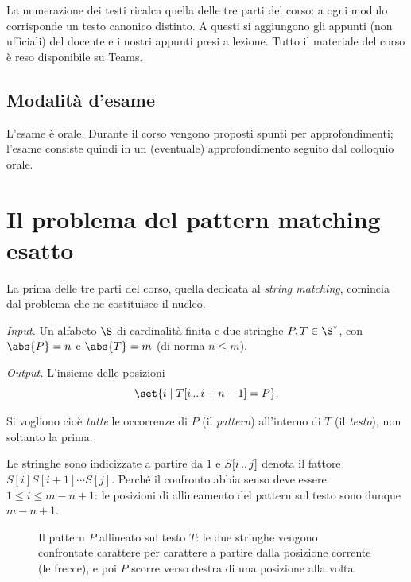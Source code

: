La numerazione dei testi ricalca quella delle tre parti del corso: a ogni modulo
corrisponde un testo canonico distinto. A questi si aggiungono gli appunti
(non ufficiali) del docente e i nostri appunti presi a lezione. Tutto il materiale
del corso è reso disponibile su Teams.

\subsection{Modalità d'esame}

L'esame è orale. Durante il corso vengono proposti spunti per approfondimenti;
l'esame consiste quindi in un (eventuale) approfondimento seguito dal colloquio orale.

\section{Il problema del pattern matching esatto}
\label{sec:pattern-matching-esatto}

La prima delle tre parti del corso, quella dedicata al \emph{string matching}, comincia
dal problema che ne costituisce il nucleo.

\begin{definizione}\label{def:pattern-matching-esatto}
\emph{Input.} Un alfabeto $\S$ di cardinalità finita e due stringhe $P,T\in\S^{*}$, con
$\abs{P}=n$ e $\abs{T}=m$ (di norma $n\le m$).

\emph{Output.} L'insieme delle posizioni
\[
  \set{i \mid \sub{T}{i}{i+n-1}=P}.
\]
\end{definizione}

Si vogliono cioè \emph{tutte} le occorrenze di $P$ (il \emph{pattern}) all'interno di $T$
(il \emph{testo}), non soltanto la prima.

\begin{osservazione}
Le stringhe sono indicizzate a partire da $1$ e $S[i\,..\,j]$ denota il fattore
$S[i]S[i+1]\cdots S[j]$. Perché il confronto abbia senso deve essere $1\le i\le m-n+1$:
le posizioni di allineamento del pattern sul testo sono dunque $m-n+1$.
\end{osservazione}

\begin{figure}[H]
\centering

\caption{Il pattern $P$ allineato sul testo $T$: le due stringhe vengono confrontate
carattere per carattere a partire dalla posizione corrente (le frecce), e poi $P$ scorre
verso destra di una posizione alla volta.}
\label{fig:pm-allineamento}
\end{figure}

